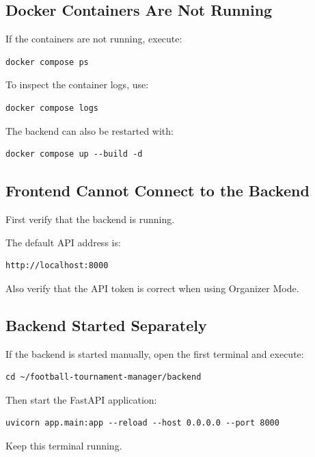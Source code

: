\documentclass[12pt,a4paper]{article}
\begin{document}
\subsection{Docker Containers Are Not Running}

If the containers are not running, execute:

\begin{lstlisting}
docker compose ps
\end{lstlisting}

To inspect the container logs, use:

\begin{lstlisting}
docker compose logs
\end{lstlisting}

The backend can also be restarted with:

\begin{lstlisting}
docker compose up --build -d
\end{lstlisting}

\subsection{Frontend Cannot Connect to the Backend}

First verify that the backend is running.

The default API address is:

\begin{lstlisting}
http://localhost:8000
\end{lstlisting}

Also verify that the API token is correct when using Organizer
Mode.

\subsection{Backend Started Separately}

If the backend is started manually, open the first terminal and
execute:

\begin{lstlisting}
cd ~/football-tournament-manager/backend
\end{lstlisting}

Then start the FastAPI application:

\begin{lstlisting}
uvicorn app.main:app --reload --host 0.0.0.0 --port 8000
\end{lstlisting}

Keep this terminal running.
\end{document}
